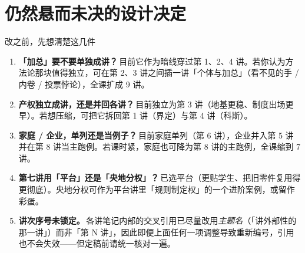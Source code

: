 \documentclass[10pt,a4paper]{ctexart}
\begin{document}
\section{仍然悬而未决的设计决定}

\begin{notebox}{改之前，先想清楚这几件}
\begin{enumerate}
  \item \textbf{「加总」要不要单独成讲？}\,目前它作为暗线穿过第 1、2、4 讲。若你认为方法论那块值得独立，可在第 2、3 讲之间插一讲「个体与加总」（看不见的手 / 内卷 / 投票悖论），全课扩成 9 讲。
  \item \textbf{产权独立成讲，还是并回各讲？}\,目前独立为第 3 讲（地基更稳、制度出场更早）。若想压缩，可把它拆回第 1 讲（界定）与第 4 讲（科斯）。
  \item \textbf{家庭 / 企业，单列还是当例子？}\,目前家庭单列（第 6 讲），企业并入第 5 讲并在第 8 讲当主跑例。若课时紧，家庭也可降为第 8 讲的主跑例，全课缩到 7 讲。
  \item \textbf{第七讲用「平台」还是「央地分权」？}\,已选平台（更贴学生、把旧零件复用得更彻底）。央地分权可作为平台讲里「规则制定权」的一个进阶案例，或留作彩蛋。
  \item \textbf{讲次序号未锁定。}\,各讲笔记内部的交叉引用已尽量改用\emph{主题名}（「讲外部性的那一讲」）而非「第 N 讲」，因此即便上面任何一项调整导致重新编号，引用也不会失效——但定稿前请统一核对一遍。
\end{enumerate}
\end{notebox}
\end{document}
